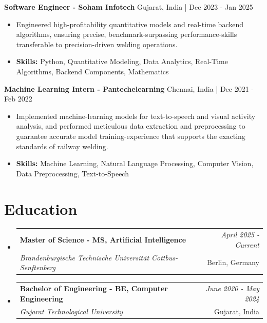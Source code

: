 \documentclass[a4paper,11pt]{article}
\makeatletter
\newcommand{\resumeSubheading}[4]{
\vspace{0.5mm}\item
    \begin{tabular*}{\linewidth}[t]{l@{\extracolsep{\fill}}r}
        \textbf{#1} & \textit{\footnotesize{#4}} \\
        \textit{\footnotesize{#3}} &  \footnotesize{#2}\\
    \end{tabular*}
    \vspace{-2.4mm}
}
\makeatother
\begin{document}
\vspace{1mm}
  \textbf{Software Engineer - Soham Infotech} \hfill Gujarat, India | Dec 2023 - Jan 2025
\vspace{-1.5mm} %
\begin{itemize}
  \item Engineered high-profitability quantitative models and real-time backend algorithms, ensuring precise, benchmark-surpassing performance-skills transferable to precision-driven welding operations.

\vspace{-2mm}
  \item \textbf{Skills:} Python, Quantitative Modeling, Data Analytics, Real-Time Algorithms, Backend Components, Mathematics
\end{itemize}

\vspace{1mm}
  \textbf{Machine Learning Intern - Pantechelearning} \hfill Chennai, India | Dec 2021 - Feb 2022
\vspace{-1.5mm} %
\begin{itemize}
  \item Implemented machine-learning models for text-to-speech and visual activity analysis, and performed meticulous data extraction and preprocessing to guarantee accurate model training-experience that supports the exacting standards of railway welding.
\vspace{-2mm}
  \item \textbf{Skills:} Machine Learning, Natural Language Processing, Computer Vision, Data Preprocessing, Text-to-Speech
\end{itemize}\section{\textbf{Education}}
\vspace{-0.4mm}

\begin{itemize}[leftmargin=0.15in, label={}]
\resumeSubheading
{Master of Science - MS, Artificial Intelligence }{Berlin, Germany}
{Brandenburgische Technische Universität Cottbus-Senftenberg  }{April 2025 - Current}

\vspace{1.0mm} %
\resumeSubheading
{Bachelor of Engineering - BE, Computer Engineering  }{Gujarat, India}
{Gujarat Technological University }{June 2020 - May 2024}

\end{itemize}
\end{document}
